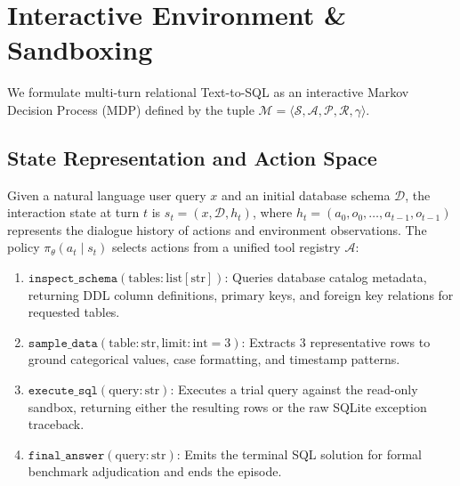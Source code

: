 \documentclass{article}
\theoremstyle{plain}
\theoremstyle{definition}
\theoremstyle{remark}
\begin{document}
\section{Interactive Environment \& Sandboxing}
\label{sec:environment}

We formulate multi-turn relational Text-to-SQL as an interactive Markov Decision Process (MDP) defined by the tuple $\mathcal{M} = \langle \mathcal{S}, \mathcal{A}, \mathcal{P}, \mathcal{R}, \gamma \rangle$. 

\subsection{State Representation and Action Space}
Given a natural language user query $x$ and an initial database schema $\mathcal{D}$, the interaction state at turn $t$ is $s_t = (x, \mathcal{D}, h_t)$, where $h_t = (a_0, o_0, \dots, a_{t-1}, o_{t-1})$ represents the dialogue history of actions and environment observations. The policy $\pi_\theta(a_t \mid s_t)$ selects actions from a unified tool registry $\mathcal{A}$:
\begin{enumerate}[leftmargin=*,itemsep=1pt]
    \item $\texttt{inspect\_schema}(\text{tables}: \text{list}[\text{str}])$: Queries database catalog metadata, returning DDL column definitions, primary keys, and foreign key relations for requested tables.
    \item $\texttt{sample\_data}(\text{table}: \text{str}, \text{limit}: \text{int}=3)$: Extracts $3$ representative rows to ground categorical values, case formatting, and timestamp patterns.
    \item $\texttt{execute\_sql}(\text{query}: \text{str})$: Executes a trial query against the read-only sandbox, returning either the resulting rows or the raw SQLite exception traceback.
    \item $\texttt{final\_answer}(\text{query}: \text{str})$: Emits the terminal SQL solution for formal benchmark adjudication and ends the episode.
\end{enumerate}
\end{document}
